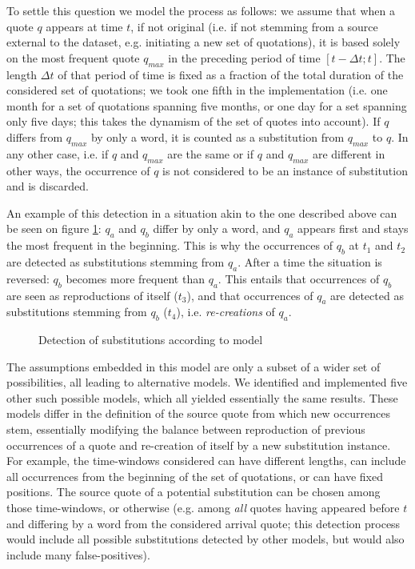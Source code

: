 To settle this question we model the process as follows: we assume that when a quote $q$ appears at time $t$, if not original (i.e. if not stemming from a source external to the dataset, e.g. initiating a new set of quotations), it is based solely on the most frequent quote $q_{max}$ in the preceding period of time $[t - \Delta t ; t]$. The length $\Delta t$ of that period of time is fixed as a fraction of the total duration of the considered set of quotations; we took one fifth in the implementation (i.e. one month for a set of quotations spanning five months, or one day for a set spanning only five days; this takes the dynamism of the set of quotes into account). If $q$ differs from $q_{max}$ by only a word, it is counted as a substitution from $q_{max}$ to $q$. In any other case, i.e. if $q$ and $q_{max}$ are the same or if $q$ and $q_{max}$ are different in other ways, the occurrence of $q$ is not considered to be an instance of substitution and is discarded.

An example of this detection in a situation akin to the one described above can be seen on figure \ref{fig:model-slidetimebags}: $q_a$ and $q_b$ differ by only a word, and $q_a$ appears first and stays the most frequent in the beginning. This is why the occurrences of $q_b$ at $t_1$ and $t_2$ are detected as substitutions stemming from $q_a$. After a time the situation is reversed: $q_b$ becomes more frequent than $q_a$. This entails that occurrences of $q_b$ are seen as reproductions of itself ($t_3$), and that occurrences of $q_a$ are detected as substitutions stemming from $q_b$ ($t_4$), i.e. \emph{re-creations} of $q_a$.

\begin{figure}[h]
    \centering
    \def\svgwidth{\textwidth}
    \small
    
    \caption{Detection of substitutions according to model }
    \label{fig:model-slidetimebags}
\end{figure}

The assumptions embedded in this model are only a subset of a wider set of possibilities, all leading to alternative models. We identified and implemented five other such possible models, which all yielded essentially the same results. These models differ in the definition of the source quote from which new occurrences stem, essentially modifying the balance between reproduction of previous occurrences of a quote and re-creation of itself by a new substitution instance. For example, the time-windows considered can have different lengths, can include all occurrences from the beginning of the set of quotations, or can have fixed positions. The source quote of a potential substitution can be chosen among those time-windows, or otherwise (e.g. among \emph{all} quotes having appeared before $t$ and differing by a word from the considered arrival quote; this detection process would include all possible substitutions detected by other models, but would also include many false-positives).


